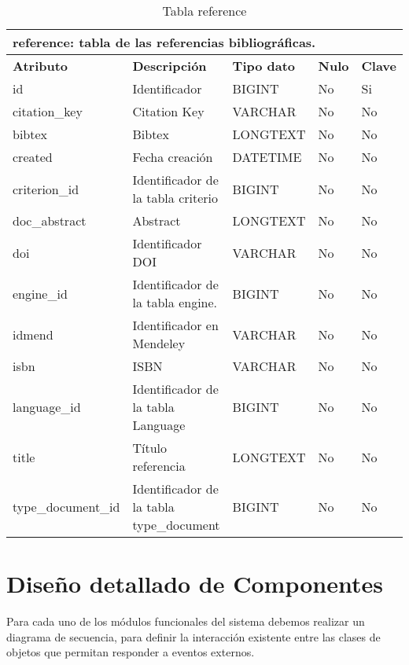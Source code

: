 \begin{table}[!hbt]
	\begin{center}
		\begin{tabular}{|p{3cm}|p{4cm}|p{4cm}|p{2cm}|p{2cm}|}
			\hline
			\multicolumn{5}{|l|}{\textbf{reference:} tabla de las referencias bibliográficas.} \\
			\hline
			\hline
			\textbf{Atributo} & \textbf{Descripción} & \textbf{Tipo dato} & \textbf{Nulo} & \textbf{Clave}\\
			\hline
			id & Identificador  & BIGINT & No & Si\\
			\hline
			citation\_key & Citation Key & VARCHAR & No & No\\
			\hline
			bibtex & Bibtex & LONGTEXT & No & No\\
			\hline
			created & Fecha creación & DATETIME & No & No\\
			\hline
			criterion\_id & Identificador de la tabla criterio & BIGINT & No & No\\
			\hline
			doc\_abstract & Abstract & LONGTEXT & No & No\\
			\hline
			doi & Identificador DOI & VARCHAR & No & No\\
			\hline
			engine\_id & Identificador de la tabla engine. & BIGINT & No & No\\
			\hline
			idmend & Identificador en Mendeley & VARCHAR & No & No\\
			\hline
			isbn & ISBN & VARCHAR & No & No\\
			\hline
			language\_id & Identificador de la tabla Language & BIGINT & No & No\\
			\hline
			title & Título referencia & LONGTEXT & No & No\\
			\hline
			type\_document\_id & Identificador de la tabla type\_document & BIGINT & No & No\\
			\hline
		\end{tabular}
		\caption{Tabla reference}
		\label{table:db-reference}
	\end{center}
\end{table}

\section{Diseño detallado de Componentes}
Para cada uno de los módulos funcionales del sistema debemos realizar un diagrama de secuencia, para definir la interacción existente entre las clases de objetos que permitan responder a eventos externos.

